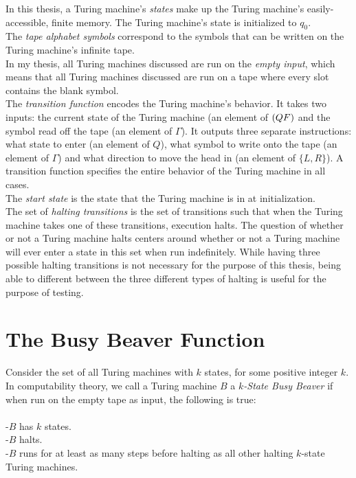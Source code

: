 \documentclass[11pt]{report}
\begin{document}
In this thesis, a Turing machine's \emph{states} make up the Turing machine's easily-accessible, finite memory. The Turing machine's state is initialized to $q_0$. \\

The \emph{tape alphabet symbols} correspond to the symbols that can be written on the Turing machine's infinite tape. \\

In my thesis, all Turing machines discussed are run on the \emph{empty input}, which means that all Turing machines discussed are run on a tape where every slot contains the blank symbol. \\

The \emph{transition function} encodes the Turing machine's behavior. It takes two inputs: the current state of the Turing machine (an element of $(Q \\ F)$ and the symbol read off the tape (an element of $\Gamma$). It outputs three separate instructions: what state to enter (an element of $Q$), what symbol to write onto the tape (an element of $\Gamma$) and what direction to move the head in (an element of $\{L, R\}$). A transition function specifies the entire behavior of the Turing machine in all cases. \\

The \emph{start state} is the state that the Turing machine is in at initialization. \\

The set of \emph{halting transitions} is the set of transitions such that when the Turing machine takes one of these transitions, execution halts. The question of whether or not a Turing machine halts centers around whether or not a Turing machine will ever enter a state in this set when run indefinitely. While having three possible halting transitions is not necessary for the purpose of this thesis, being able to different between the three different types of halting is useful for the purpose of testing.

\section{The Busy Beaver Function}

Consider the set of all Turing machines with $k$ states, for some positive integer $k$. In computability theory, we call a Turing machine $B$ a $k$\emph{-State Busy Beaver} if when run on the empty tape as input, the following is true: \\ \\
-$B$ has $k$ states. \\
-$B$ halts. \\
-$B$ runs for at least as many steps before halting as all other halting $k$-state Turing machines. \\
\end{document}
